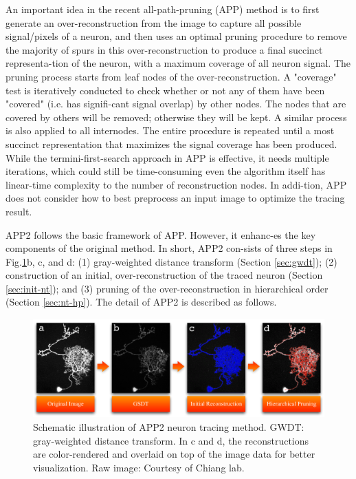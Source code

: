 An important idea in the recent all-path-pruning (APP) method \cite{peng2011automatic} is to first generate an over-reconstruction from the image to capture all possible signal/pixels of a neuron, and then uses an optimal pruning procedure to remove the majority of spurs in this over-reconstruction to produce a final succinct representa-tion of the neuron, with a maximum coverage of all neuron signal. The pruning process starts from leaf nodes of the over-reconstruction. A "coverage" test is iteratively conducted to check whether or not any of them have been "covered" (i.e. has signifi-cant signal overlap) by other nodes. The nodes that are covered by others will be removed; otherwise they will be kept. A similar process is also applied to all internodes. The entire procedure is repeated until a most succinct representation that maximizes the signal coverage has been produced. While the termini-first-search approach in APP is effective, it needs multiple iterations, which could still be time-consuming even the algorithm itself has linear-time complexity to the number of reconstruction nodes. In addi-tion, APP does not consider how to best preprocess an input image to optimize the tracing result. 

APP2 follows the basic framework of APP. However, it enhanc-es the key components of the original method. In short, APP2 con-sists of three steps in Fig.\ref{fig:autont-fig1}b, c, and d: (1) gray-weighted distance transform (Section \ref{sec:gwdt}); (2) construction of an initial, over-reconstruction of the traced neuron (Section \ref{sec:init-nt}); and (3) pruning of the over-reconstruction in hierarchical order (Section \ref{sec:nt-hp}). The detail of APP2 is described as follows.

\begin{figure}[htbp]
\centering
\includegraphics[width=1.0\textwidth]{images/autont_fig1}
\caption[Schematic illustration of APP2 neuron tracing method]{Schematic illustration of APP2 neuron tracing method. GWDT: gray-weighted distance transform. In c and d, the reconstructions are color-rendered and overlaid on top of the image data for better visualization. Raw image: Courtesy of Chiang lab.}
\label{fig:autont-fig1}
\end{figure}
